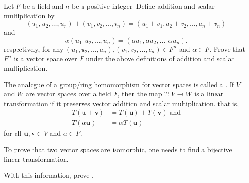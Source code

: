 \begin{problem}
    Let $F$ be a field and $n$ be a positive integer. Define addition and scalar multiplication by
    \[
        (u_1, u_2, \dots, u_n) + (v_1, v_2, \dots, v_n) = (u_1 + v_1, u_2 + v_2, \dots, u_n + v_n)
    \]
    and
    \[
        \alpha(u_1, u_2, \dots, u_n) = (\alpha u_1, \alpha u_2, \dots, \alpha u_n).
    \]
    respectively, for any $(u_1, u_2, \dots, u_n), (v_1, v_2, \dots, v_n) \in F^n$ and $\alpha \in F$. Prove that $F^n$ is a vector space over $F$ under the above definitions of addition and scalar multiplication.
\end{problem}

\begin{problem}\label{problem-vector-space-of-dimension-n-isomorphic-to-F^n}
    The analogue of a group/ring homomorphism for vector spaces is called a . If $V$ and $W$ are vector spaces over a field $F$, then the map $T: V \to W$ is a linear transformation if it preserves vector addition and scalar multiplication, that is,
    \begin{align*}
        T(\mathbf{u} + \mathbf{v}) &= T(\mathbf{u}) + T(\mathbf{v}) \text{ and}\\
        T(\alpha\mathbf{u}) &= \alpha T(\mathbf{u})
    \end{align*}
    for all $\mathbf{u}, \mathbf{v} \in V$ and $\alpha \in F$.

    To prove that two vector spaces are isomorphic, one needs to find a bijective linear transformation.

    With this information, prove .
\end{problem}
